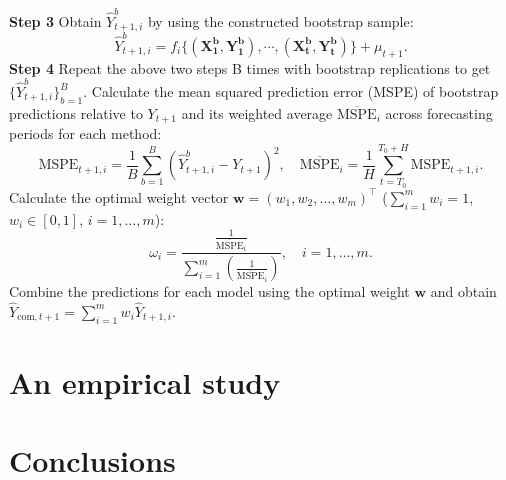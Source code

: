 \documentclass[12pt]{article}
\begin{document}
\begin{algorithm}
\begin{algorithmic}[1]
    \STATE \textbf{Step 3} Obtain $\hat{Y}_{t+1,i}^b$ by using the constructed bootstrap sample:
     \[
      \hat{Y}_{t+1, i}^b = f_i\{(\bm{X_1^b}, \bm{Y_1^b}), \cdots, (\bm{X_{t}^b}, \bm{Y_t^b})\} + \mu_{t+1}.
    \]
    \STATE \textbf{Step 4} Repeat the above two steps B times with bootstrap replications to get  $\{\hat{Y}_{t+1, i}^b\}_{b=1}^B$.
    \STATE Calculate the mean squared prediction error (MSPE) of bootstrap predictions relative to $Y_{t+1}$ and its weighted average $\overline{\text{MSPE}}_i$ across forecasting periods for each method:
    \[
      \text{MSPE}_{t+1,i} = \frac{1}{B} \sum_{b=1}^B \left( \hat{Y}_{t+1, i}^b - Y_{t+1} \right)^2, \quad \overline{\text{MSPE}}_i = \frac{1}{H} \sum_{t=T_0}^{T_0+H} \text{MSPE}_{t+1,i}.
    \]
    \ENDFOR
    \STATE Calculate the optimal weight vector \( \boldsymbol{w} = (w_1, w_2, \dots, w_m)^\top\) (\( \sum_{i=1}^m w_i = 1 \), \( w_i \in [0,1] \), \( i = 1, \dots, m \)):
    \[
    \omega_i = \frac{\frac{1}{\overline{\text{MSPE}}_i}}{\sum_{i=1}^m(\frac{1}{\overline{\text{MSPE}}_i})}, \quad i = 1, \dots, m.
    \]
    \STATE Combine the predictions for each model using the optimal weight \( \boldsymbol{w} \) and obtain $\hat{Y}_{\text{com},t+1} = \sum_{i=1}^m w_i\hat{Y}_{t+1,i}$.
\ENDFOR
\end{algorithmic}
\end{algorithm}









\section{An empirical study}
\paragraph{}

\section{Conclusions}
\paragraph{}

\bigskip


\end{document}
